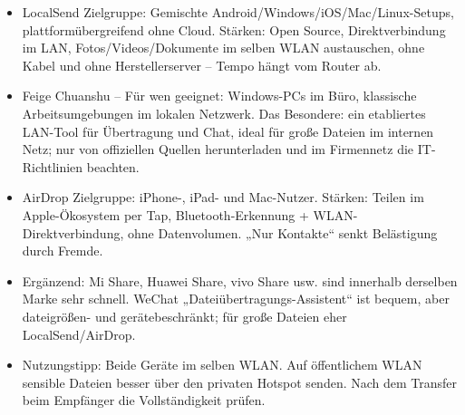 
\begin{itemize}
  \item LocalSend Zielgruppe: Gemischte Android/Windows/iOS/Mac/Linux-Setups, plattformübergreifend ohne Cloud. Stärken: Open Source, Direktverbindung im LAN, Fotos/Videos/Dokumente im selben WLAN austauschen, ohne Kabel und ohne Herstellerserver – Tempo hängt vom Router ab.
  \item Feige Chuanshu – Für wen geeignet: Windows-PCs im Büro, klassische Arbeitsumgebungen im lokalen Netzwerk. Das Besondere: ein etabliertes LAN-Tool für Übertragung und Chat, ideal für große Dateien im internen Netz; nur von offiziellen Quellen herunterladen und im Firmennetz die IT-Richtlinien beachten.
  \item AirDrop Zielgruppe: iPhone-, iPad- und Mac-Nutzer. Stärken: Teilen im Apple-Ökosystem per Tap, Bluetooth-Erkennung + WLAN-Direktverbindung, ohne Datenvolumen. „Nur Kontakte“ senkt Belästigung durch Fremde.
  \item Ergänzend: Mi Share, Huawei Share, vivo Share usw. sind innerhalb derselben Marke sehr schnell. WeChat „Dateiübertragungs-Assistent“ ist bequem, aber dateigrößen- und gerätebeschränkt; für große Dateien eher LocalSend/AirDrop.
  \item Nutzungstipp: Beide Geräte im selben WLAN. Auf öffentlichem WLAN sensible Dateien besser über den privaten Hotspot senden. Nach dem Transfer beim Empfänger die Vollständigkeit prüfen.
\end{itemize}


